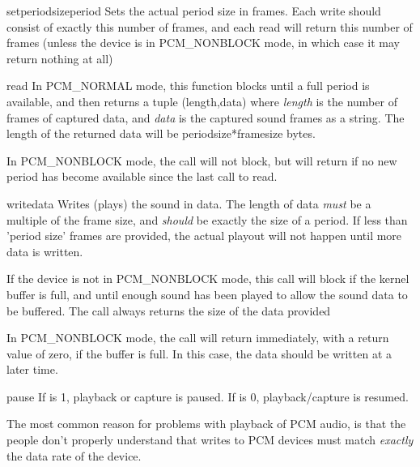 \begin{methoddesc}[PCM]{setperiodsize}{period}
  Sets the actual period size in frames. Each write should consist of
  exactly this number of frames, and each read will return this number
  of frames (unless the device is in PCM_NONBLOCK mode, in which case
  it may return nothing at all)
\end{methoddesc}

\begin{methoddesc}[PCM]{read}{}
  In PCM_NORMAL mode, this function blocks until a full period is
  available, and then returns a tuple (length,data) where
  \emph{length} is the number of frames of captured data, and
  \emph{data} is the captured sound frames as a string. The length of
  the returned data will be periodsize*framesize bytes.

  In PCM_NONBLOCK mode, the call will not block, but will return
   if no new period has become available since the last
  call to read.
\end{methoddesc}

\begin{methoddesc}[PCM]{write}{data}
  Writes (plays) the sound in data. The length of data \emph{must} be
  a multiple of the frame size, and \emph{should} be exactly the size
  of a period. If less than 'period size' frames are provided, the
  actual playout will not happen until more data is written.

  If the device is not in PCM_NONBLOCK mode, this call will block if
  the kernel buffer is full, and until enough sound has been played to
  allow the sound data to be buffered. The call always returns the
  size of the data provided

  In PCM_NONBLOCK mode, the call will return immediately, with a
  return value of zero, if the buffer is full. In this case, the data
  should be written at a later time.
\end{methoddesc}

\begin{methoddesc}[PCM]{pause}{}
  If  is 1, playback or capture is paused. If  is 0, 
  playback/capture is resumed.
\end{methoddesc}


The most common reason for problems with playback of PCM audio, is
that the people don't properly understand that writes to PCM devices
must match \emph{exactly} the data rate of the device.

